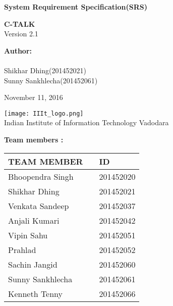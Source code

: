 \documentclass[12pt]{article}
\def\mydate{November 11, 2016}
\begin{document}
	
	\begin{titlepage}
		\begin{center}
			
			
			\LARGE{\textbf{System Requirement Specification(SRS)}}
			
			\vspace{1.5cm}
			
			\textbf{C-TALK}\\
			
			\small{Version 2.1}
			\vspace{2cm}
		 
        \large{\textbf{Author:}}\\
			  \large{ \\ Shikhar Dhing(201452021) \\Sunny Sankhlecha(201452061)}	
			  
			  
			\vspace{1.5cm}
			\mydate{}
			
			
			\vspace{5cm}
			\texttt{[image: IIIt\_logo.png]} \\
			\Large{Indian Institute of Information Technology Vadodara} \\
			
		\end{center}
	\end{titlepage}
	\textbf{Team members :} \\
		\begin{center}
		
		\begin{tabular}{ |m{10em} m{8em} m{9em}|}
			\hline
			TEAM MEMBER          &   & ID        \\
			\hline
			Bhoopendra Singh     &   & 201452020 \\
			Shikhar Dhing        &   & 201452021 \\
			Venkata Sandeep      &   & 201452037 \\
			Anjali Kumari        &   & 201452042 \\
			Vipin Sahu           &   & 201452051 \\
			Prahlad              &   & 201452052 \\ 
			Sachin Jangid        &   & 201452060 \\
			Sunny Sankhlecha     &   & 201452061 \\
			Kenneth Tenny        &   & 201452066 \\
			\hline
		\end{tabular}
		
	\end{center}
	\vspace{2em}
	
\end{document}
